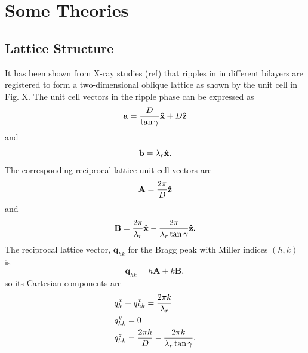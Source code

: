 \section{Some Theories}
\subsection{Lattice Structure}
It has been shown from X-ray studies (ref) that ripples in in different bilayers
are registered to form a two-dimensional oblique lattice as shown by the unit 
cell in Fig. X. 
The unit cell vectors in the ripple phase can be expressed as 
\begin{equation}
  \mathbf{a} = \frac{D}{\tan\gamma}\mathbf{\hat{x}} + D\mathbf{\hat{z}}
\end{equation}
and
\begin{equation}
  \mathbf{b} = \lambda_r\mathbf{\hat{x}}.
\end{equation}
The corresponding reciprocal lattice unit cell vectors are
\begin{equation}
  \mathbf{A} = \frac{2\pi}{D}\mathbf{\hat{z}}
\end{equation}
and
\begin{equation}
  \mathbf{B} = \frac{2\pi}{\lambda_r}\mathbf{\hat{x}} - \frac{2\pi}{\lambda_r\tan\gamma}\mathbf{\hat{z}}.
\end{equation}
The reciprocal lattice vector, $\mathbf{q}_{hk}$ for the Bragg peak with 
Miller indices $(h,k)$ is 
\begin{equation}
  \mathbf{q}_{hk}=h\mathbf{A}+k\mathbf{B},
\end{equation}
so its Cartesian components are
\begin{align}
  & q_{k}^x \equiv q_{hk}^x = \frac{2\pi k}{\lambda_r} \\
  & q_{hk}^y = 0 \\
  & q_{hk}^z = \frac{2\pi h}{D} - \frac{2\pi k}{\lambda_r\tan\gamma}.
\end{align}


